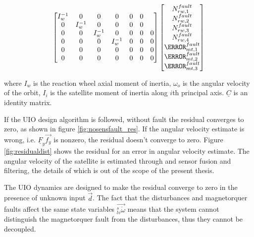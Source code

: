 \begin{align}
\begin{bmatrix}
 I_w^{-1} & 0 & 0 & 0 & 0 & 0 \\
 0 & I_w^{-1} & 0 & 0 & 0 & 0 \\ 
 0 & 0 & I_w^{-1} & 0& 0 & 0 & 0 \\  
 0 & 0 & 0 & I_w^{-1} & 0 & 0 & 0 \\
 0 & 0 & 0 & 0 & 0 & 0& 0 \\
 0 & 0 & 0 & 0 & 0& 0 & 0 \\
 \end{bmatrix}
 \begin{bmatrix}
 N^{fault}_{rw,1} \\
 N^{fault}_{rw,2} \\
 N^{fault}_{rw,3}\\
 N^{fault}_{rw,4}\\
 \m^{fault}_{mt,1} \\
 \m^{fault}_{mt,2} \\
 \m^{fault}_{mt,3} 
 \end{bmatrix}
\label{eq:uioMatrices}
\end{align}
\normalsize

where $I_w$ is the reaction wheel axial moment of inertia, $\omega_o$ is the angular velocity of the orbit, $I_i$ is the satellite moment of inertia along $i$th principal axis. $\underline{C}$ is an identity matrix. 

If the UIO design algorithm is followed, without fault the residual converges to zero, as shown in figure \ref{fig:nosensfault_res}. If the angular velocity estimate is wrong, i.e. $\underline{F}_y \vec{f_y}$ is nonzero, the residual doesn't converge to zero. Figure \ref{fig:residualdist} shows the residual for an error in angular velocity estimate. The angular velocity of the satellite is estimated through and sensor fusion and filtering, the details of which is out of the scope of the present thesis.

The UIO dynamics are designed to make the residual converge to zero in the presence of unknown input $\vec{d}$. The fact that the disturbances and magnetorquer faults affect the same state variables $\vec{_{lv}^s\dot{\omega}}$ means that the system cannot distinguish the magnetorquer fault from the disturbances, thus they cannot be decoupled.

